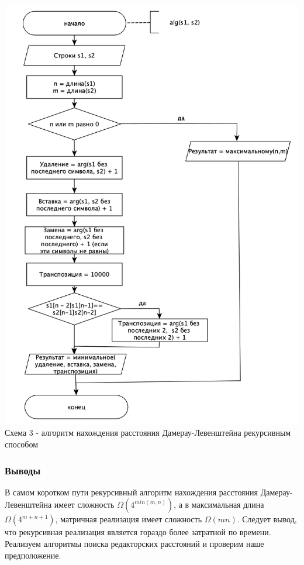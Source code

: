 \documentclass[a4paper,14pt]{article} %
\begin{document}
	\begin{center}
        		\includegraphics[scale = 0.5]{shema3} \\ Схема  3 - алгоритм нахождения расстояния Дамерау-Левенштейна рекурсивным способом
	\end{center}	
	
	\subsubsection{Выводы}
	В самом коротком пути рекурсивный алгоритм нахождения расстояния Дамерау-Левенштейна имеет сложность $\Omega(4^{min(m,n)})$, а в максимальная длина $\Omega(4^{m + n + 1})$, матричная реализация имеет сложность $\Omega(mn)$. Следует вывод, что рекурсивная реализация является гораздо более затратной по времени. Реализуем алгоритмы поиска редакторских расстояний и проверим наше предположение. 
\end{document}
